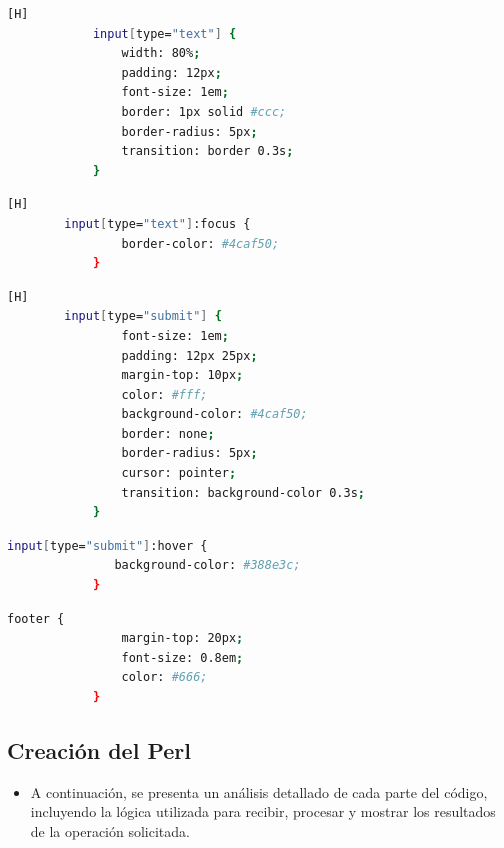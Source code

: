 \documentclass{article}
\begin{document}
	\begin{lstlisting}[language=bash,caption={Este estilo hace que los campos de entrada de texto sean funcionales y atractivos.}][H]
            input[type="text"] {
                width: 80%;
                padding: 12px;
                font-size: 1em;
                border: 1px solid #ccc;
                border-radius: 5px;
                transition: border 0.3s;
            }
	\end{lstlisting}
	    
	\begin{lstlisting}[language=bash,caption={Da un estilo al campo de texto cuando lo selecciona, el borde cambia a un color verde vibrante.}][H]
		input[type="text"]:focus {
                border-color: #4caf50;
            }
	\end{lstlisting}
	\begin{lstlisting}[language=bash,caption={Le dara un estilo al botón de envío}][H]
		input[type="submit"] {
                font-size: 1em;
                padding: 12px 25px;
                margin-top: 10px;
                color: #fff;
                background-color: #4caf50;
                border: none;
                border-radius: 5px;
                cursor: pointer;
                transition: background-color 0.3s;
            }
	\end{lstlisting}

        \begin{lstlisting}[language=bash,caption={Cambia el color de fondo a un verde más oscuro cuando el cursor está sobre el botón}, label={lst:color-boton}]
            input[type="submit"]:hover {
               background-color: #388e3c;
            }
        \end{lstlisting} 
        
        \begin{lstlisting}[language=bash,caption={Este le dara un estilo para el pie de página}, label={lst:color-boton}]
            footer {
                margin-top: 20px;
                font-size: 0.8em;
                color: #666;
            }
        \end{lstlisting}	
		
	\subsection{Creación del Perl}
        \begin{itemize}
            \item A continuación, se presenta un análisis detallado de cada parte del código, incluyendo la lógica utilizada para recibir, procesar y mostrar los resultados de la operación solicitada.
        \end{itemize}
\end{document}
